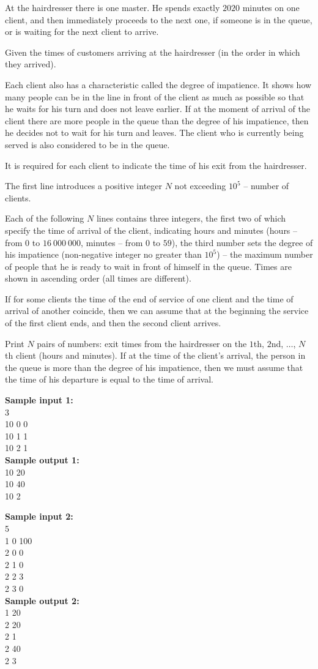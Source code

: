\documentclass[a4paper]{article}
\begin{document}
At the hairdresser there is one master. He spends exactly $2020$ minutes on one client, and then immediately proceeds to the next one, if someone is in the queue, or is waiting for the next client to arrive.

Given the times of customers arriving at the hairdresser (in the order in which they arrived).

Each client also has a characteristic called the degree of impatience. It shows how many people can be in the line in front of the client as much as possible so that he waits for his turn and does not leave earlier. If at the moment of arrival of the client there are more people in the queue than the degree of his impatience, then he decides not to wait for his turn and leaves. The client who is currently being served is also considered to be in the queue.

It is required for each client to indicate the time of his exit from the hairdresser.

The first line introduces a positive integer $N$ not exceeding $10^5$ -- number of clients.

Each of the following $N$ lines contains three integers, the first two of which specify the time of arrival of the client, indicating hours and minutes (hours -- from $0$ to $16 \ 000 \ 000$, minutes -- from $0$ to $59$), the third number sets the degree of his impatience (non-negative integer no greater than $10^5$) -- the maximum number of people that he is ready to wait in front of himself in the queue.
Times are shown in ascending order (all times are different).

If for some clients the time of the end of service of one client and the time of arrival of another coincide, then we can assume that at the beginning the service of the first client ends, and then the second client arrives.

Print $N$ pairs of numbers: exit times from the hairdresser on the $1$th, $2$nd, $\dots$, $N$th client (hours and minutes).
If at the time of the client's arrival, the person in the queue is more than the degree of his impatience, then we must assume that the time of his departure is equal to the time of arrival.

\LINE

\noindent \textbf{Sample input 1:}\\
3\\
10 0 0\\
10 1 1\\
10 2 1\\


\noindent \textbf{Sample output 1:}\\
10 20\\
10 40\\
10 2\\


\SPACE


\noindent \textbf{Sample input 2:}\\
5\\
1 0 100\\
2 0 0\\
2 1 0\\
2 2 3\\
2 3 0\\

\noindent \textbf{Sample output 2:}\\
1 20\\
2 20\\
2 1\\
2 40\\
2 3\\
\end{document}
